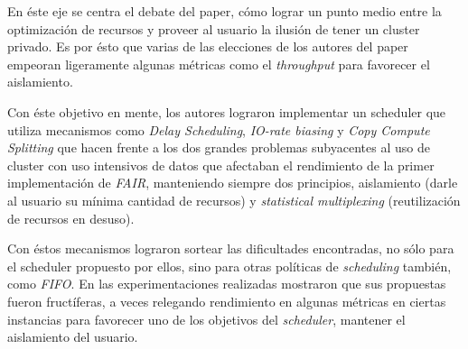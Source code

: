 \documentclass[a4paper]{article}
\begin{document}
En éste eje se centra el debate del paper, cómo lograr un punto medio entre
la optimización de recursos y proveer al usuario la ilusión de tener un
cluster privado. Es por ésto que varias de las elecciones de los autores del
paper empeoran ligeramente algunas métricas como el \textit{throughput} para 
favorecer el aislamiento.

Con éste objetivo en mente, los autores lograron implementar un scheduler que
utiliza mecanismos como \textit{Delay Scheduling}, \textit{IO-rate biasing} y
\textit{Copy Compute Splitting} que hacen frente a los dos grandes problemas
subyacentes al uso de cluster con uso intensivos de datos que afectaban el
rendimiento de la primer implementación de \textit{FAIR}, manteniendo siempre
dos principios, aislamiento (darle al usuario su mínima cantidad de recursos) y
\textit{statistical multiplexing} (reutilización de recursos en desuso).

Con éstos mecanismos lograron sortear las dificultades encontradas, no sólo
para el scheduler propuesto por ellos, sino para otras políticas de
\textit{scheduling} también, como \textit{FIFO}. En las experimentaciones
realizadas mostraron que sus propuestas fueron fructíferas, a veces relegando
rendimiento en algunas métricas en ciertas instancias para favorecer uno de los
objetivos del \textit{scheduler}, mantener el aislamiento del usuario.
\end{document}

